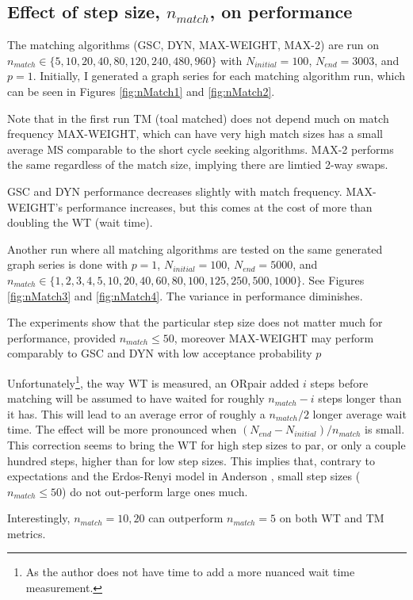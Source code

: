 \documentclass[main.tex]{subfiles}
\begin{document}
\subsection{Effect of step size, $n_{match}$, on performance} \label{exp:nmatch}
The matching algorithms (GSC, DYN, MAX-WEIGHT, MAX-2) are run on $n_{match} \in \{5, 10, 20, 40, 80, 120, 240, 480, 960\}$ with $N_{initial} = 100$, $N_{end} = 3003$, and $p = 1$. Initially, I generated a graph series for each matching algorithm run, which can be seen in Figures \ref{fig:nMatch1} and \ref{fig:nMatch2}.

Note that in the first run TM (toal matched) does not depend much on match frequency MAX-WEIGHT, which can have very high match sizes has a small average MS comparable to the short cycle seeking algorithms. MAX-2 performs the same regardless of the match size, implying there are limtied 2-way swaps.

GSC and DYN performance decreases slightly with match frequency. MAX-WEIGHT's performance increases, but this comes at the cost of more than doubling the WT (wait time).

Another run where all matching algorithms are tested on the same generated graph series is done with $p=1$, $N_{initial} = 100$, $N_{end} = 5000$, and $n_{match} \in \{1, 2, 3, 4, 5, 10, 20, 40, 60, 80, 100, 125, 250, 500, 1000\}$. See Figures \ref{fig:nMatch3} and \ref{fig:nMatch4}. The variance in performance diminishes.

The experiments show that the particular step size does not matter much for performance, provided $n_{match} \leq 50$, moreover MAX-WEIGHT may perform comparably to GSC and DYN with low acceptance probability $p$

Unfortunately\footnote{As the author does not have time to add a more nuanced wait time measurement.}, the way WT is measured, an ORpair added $i$ steps before matching will be assumed to have waited for roughly $n_{match} - i$ steps longer than it has. This will lead to an average error of roughly a $n_{match}/2$ longer average wait time. The effect will be more pronounced when $(N_{end} - N_{initial}) / n_{match}$ is small. This correction seems to bring the WT for high step sizes to par, or only a couple hundred steps, higher than for low step sizes. This implies that, contrary to expectations and the Erdos-Renyi model in Anderson \cite{And1}, small step sizes ($n_{match} \leq 50$) do not out-perform large ones much.

Interestingly, $n_{match} = {10, 20}$ can outperform $n_{match} = {5}$ on both WT and TM metrics.
\end{document}
